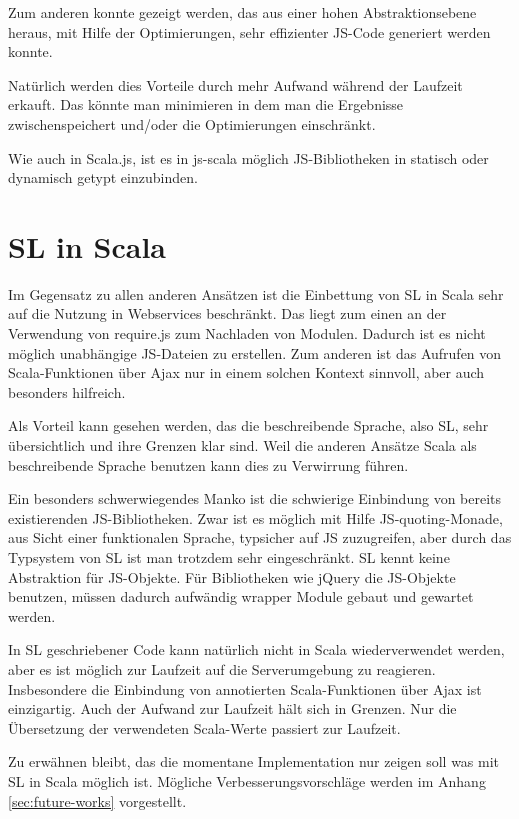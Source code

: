 \documentclass[12pt,bibtotoc]{scrreprt}
\begin{document}
Zum anderen konnte gezeigt werden, das aus einer hohen Abstraktionsebene heraus, mit Hilfe der Optimierungen, sehr effizienter JS-Code generiert werden konnte\cite{Richard-Foy2013}.

Natürlich werden dies Vorteile durch mehr Aufwand während der Laufzeit erkauft. Das könnte man minimieren in dem man die Ergebnisse zwischenspeichert und/oder die Optimierungen einschränkt.

Wie auch in Scala.js, ist es in js-scala möglich JS-Bibliotheken in statisch oder dynamisch getypt einzubinden.

\section{SL in Scala}

Im Gegensatz zu allen anderen Ansätzen ist die Einbettung von SL in Scala sehr auf die Nutzung in Webservices beschränkt. Das liegt zum einen an der Verwendung von require.js zum Nachladen von Modulen. Dadurch ist es nicht möglich unabhängige JS-Dateien zu erstellen. Zum anderen ist das Aufrufen von Scala-Funktionen über Ajax nur in einem solchen Kontext sinnvoll, aber auch besonders hilfreich.

Als Vorteil kann gesehen werden, das die beschreibende Sprache, also SL, sehr übersichtlich und ihre Grenzen klar sind. Weil die anderen Ansätze Scala als beschreibende Sprache benutzen kann dies zu Verwirrung führen. 

Ein besonders schwerwiegendes Manko ist die schwierige Einbindung von bereits existierenden JS-Bibliotheken. Zwar ist es möglich mit Hilfe JS-quoting-Monade, aus Sicht einer funktionalen Sprache, typsicher auf JS zuzugreifen, aber durch das Typsystem von SL ist man trotzdem sehr eingeschränkt. SL kennt keine Abstraktion für JS-Objekte. Für Bibliotheken wie jQuery die JS-Objekte benutzen, müssen dadurch aufwändig wrapper Module gebaut und gewartet werden. 

In SL geschriebener Code kann natürlich nicht in Scala wiederverwendet werden, aber es ist möglich zur Laufzeit auf die Serverumgebung zu reagieren. Insbesondere die Einbindung von annotierten Scala-Funktionen über Ajax ist einzigartig. Auch der Aufwand zur Laufzeit hält sich in Grenzen. Nur die Übersetzung der verwendeten Scala-Werte passiert zur Laufzeit.

Zu erwähnen bleibt, das die momentane Implementation nur zeigen soll was mit SL in Scala möglich ist. Mögliche Verbesserungsvorschläge werden im Anhang \ref{sec:future-works} vorgestellt.
\end{document}
